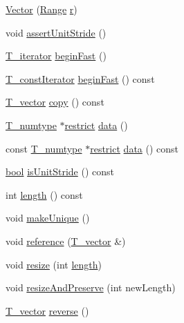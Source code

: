 \begin{DoxyCompactItemize}
\item 
\hyperlink{classVector_a01a63661317f3e014e7c561074796b0c}{Vector} (\hyperlink{classRange}{Range} \hyperlink{indexexpr_8h_ac434fd11cc2493608d8d91424d60c17e}{r})
\item 
void \hyperlink{classVector_a72444363cd75161cadbb9bfe7cb4280d}{assert\+Unit\+Stride} ()
\item 
\hyperlink{classVector_a3595565cd5a82f30d054fe37d0aaa802}{T\+\_\+iterator} \hyperlink{classVector_a591f75ccd54446d9d5b9a3dad62da79a}{begin\+Fast} ()
\item 
\hyperlink{classVector_a6713f9dd10d7bd7d91b7452cf0208565}{T\+\_\+const\+Iterator} \hyperlink{classVector_aa85824e5320a1ae5f9900602c4e1f9f1}{begin\+Fast} () const 
\item 
\hyperlink{classVector_a29e279edfeac4d65aad0d814c05cfaf0}{T\+\_\+vector} \hyperlink{classVector_aecee46a06de1f0326245188d4aeecac5}{copy} () const 
\item 
\hyperlink{classVector_a63dfe9fb06d8b4595b9e8fb10fc0755e}{T\+\_\+numtype} $\ast$\hyperlink{compiler_8h_a080abdcb9c02438f1cd2bb707af25af8}{restrict} \hyperlink{classVector_a5a39ac5863d5fd6e859b782ff4ce956f}{data} ()
\item 
const \hyperlink{classVector_a63dfe9fb06d8b4595b9e8fb10fc0755e}{T\+\_\+numtype} $\ast$\hyperlink{compiler_8h_a080abdcb9c02438f1cd2bb707af25af8}{restrict} \hyperlink{classVector_a6296f596c36a329f8f0af3ae48fc93fc}{data} () const 
\item 
\hyperlink{compiler_8h_abb452686968e48b67397da5f97445f5b}{bool} \hyperlink{classVector_aa4ae0c8062004e1cf31e272f79ce9227}{is\+Unit\+Stride} () const 
\item 
int \hyperlink{classVector_ad4853c638cc673c9482cea9b75ef6de2}{length} () const 
\item 
void \hyperlink{classVector_a68ac4820260c10b5993729f2b5a40067}{make\+Unique} ()
\item 
void \hyperlink{classVector_a46f8e9952216f3a25dfccfe93901af88}{reference} (\hyperlink{classVector_a29e279edfeac4d65aad0d814c05cfaf0}{T\+\_\+vector} \&)
\item 
void \hyperlink{classVector_abcb311f63292603d3800bc33e8a68c22}{resize} (int \hyperlink{classVector_ad4853c638cc673c9482cea9b75ef6de2}{length})
\item 
void \hyperlink{classVector_abb89965ed772d10ba2e111e3a3805adc}{resize\+And\+Preserve} (int new\+Length)
\item 
\hyperlink{classVector_a29e279edfeac4d65aad0d814c05cfaf0}{T\+\_\+vector} \hyperlink{classVector_a3e90ce0f4782c74833d15958860197d6}{reverse} ()

\end{DoxyCompactItemize}
